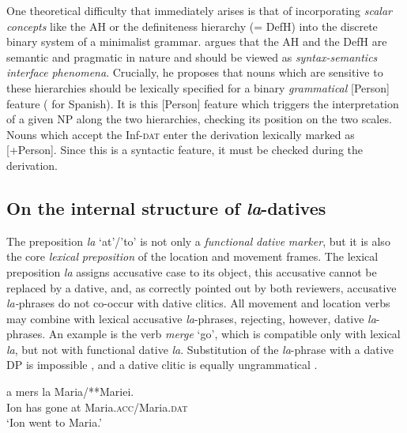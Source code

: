 \documentclass[output=paper,colorlinks,citecolor=brown,nonflat]{./langscibook}
\begin{document}
One theoretical difficulty that immediately arises is that of incorporating \textit{scalar} \textit{concepts} like the AH or the definiteness hierarchy (= DefH) into the discrete binary system of a minimalist grammar. \citet{Richards2008} argues that the AH and the DefH are semantic and pragmatic in nature and should be viewed as \textit{syntax-semantics} \textit{interface} \textit{phenomena}. Crucially, he proposes that nouns which are sensitive to these hierarchies should be lexically specified for a binary \textit{grammatical} [Person] feature (\citealt{Rodríguez-Mondoñedo2007} for Spanish). It is this [Person] feature which triggers the interpretation of a given NP along the two hierarchies, checking its position on the two scales. Nouns which accept the Inf-\textsc{dat} enter the derivation lexically marked as [+Person]. Since this is a syntactic feature, it must be checked during the derivation. 

\subsection{ On the internal structure of \textit{la}-datives}

The preposition \textit{la} ‘at’/’to’ is not only a \textit{functional} \textit{dative} \textit{marker}, but it is also the core \textit{lexical} \textit{preposition} of the location and movement frames. The lexical preposition \textit{la} assigns accusative case to its object, this accusative cannot be replaced by a dative, and, as correctly pointed out by both reviewers, accusative \textit{la-}phrases do not co-occur with dative clitics. All movement and location verbs may combine with lexical accusative \textit{la}{}-phrases, rejecting, however, dative \textit{la}{}-phrases. An example is the verb \textit{merge} ‘go’, which is compatible only with lexical \textit{la}, but not with functional dative \textit{la}. Substitution of the \textit{la}{}-phrase with a dative DP is impossible , and a dative clitic is equally ungrammatical . 

\ea%
    \label{ex:cornilescu:9}
    \ea \label{ex:cornilescu:9a}
     {a} {mers} {la} Maria/**Mariei.	\\
    		Ion has gone at Maria.\textsc{acc}/Maria.\textsc{dat}\\
    \glt ‘Ion went to Maria.’
    \z 
    \z
\end{document}
